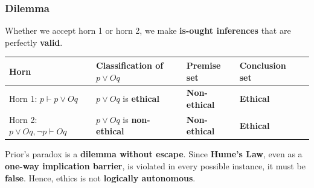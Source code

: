\documentclass[11pt]{article}
\begin{document}
\subsubsection{Dilemma}
\label{sec:orgee8ae23}
Whether we accept horn 1 or horn 2, we make \textbf{is-ought inferences} that are perfectly \textbf{valid}.
\begin{center}
\begin{tabularx}{\textwidth}{|X|X|X|X|X|}
\hline
Horn & Classification of \(p \vee Oq\) & Premise set & Conclusion set\\
\hline
Horn 1: \(p \vdash p \vee Oq\) & \(p \vee Oq\) is \textbf{ethical} & \textbf{Non-ethical} & \textbf{Ethical}\\
\hline
Horn 2: \(p \vee Oq, \neg p \vdash Oq\) & \(p \vee Oq\) is \textbf{non-ethical} & \textbf{Non-ethical} & \textbf{Ethical}\\
\hline
\end{tabularx}
\end{center}
Prior's paradox is a \textbf{dilemma without escape}. Since \textbf{Hume's Law}, even as a \textbf{one-way implication barrier}, is violated in every possible instance, it must be \textbf{false}. Hence, ethics is not \textbf{logically autonomous}.

 \newpage
\end{document}
